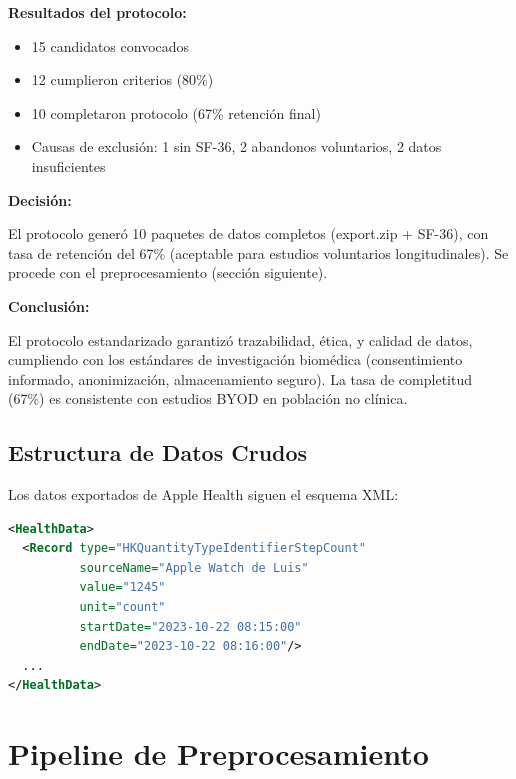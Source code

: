 \documentclass[12pt,letterpaper,twoside]{report}
\begin{document}
\begin{calculobox}
\textbf{Resultados del protocolo:}

\begin{itemize}[noitemsep]
    \item 15 candidatos convocados
    \item 12 cumplieron criterios (80\%)
    \item 10 completaron protocolo (67\% retención final)
    \item Causas de exclusión: 1 sin SF-36, 2 abandonos voluntarios, 2 datos insuficientes
\end{itemize}
\end{calculobox}

\begin{decisionbox}
\textbf{Decisión:}

El protocolo generó 10 paquetes de datos completos (export.zip + SF-36), con tasa de retención del 67\% (aceptable para estudios voluntarios longitudinales). Se procede con el preprocesamiento (sección siguiente).
\end{decisionbox}

\begin{conclusionbox}
\textbf{Conclusión:}

El protocolo estandarizado garantizó trazabilidad, ética, y calidad de datos, cumpliendo con los estándares de investigación biomédica (consentimiento informado, anonimización, almacenamiento seguro). La tasa de completitud (67\%) es consistente con estudios BYOD en población no clínica.
\end{conclusionbox}

\subsection{Estructura de Datos Crudos}

Los datos exportados de Apple Health siguen el esquema XML:

\begin{lstlisting}[language=XML, caption={Estructura XML de Apple Health Export}]
<HealthData>
  <Record type="HKQuantityTypeIdentifierStepCount"
          sourceName="Apple Watch de Luis"
          value="1245"
          unit="count"
          startDate="2023-10-22 08:15:00"
          endDate="2023-10-22 08:16:00"/>
  ...
</HealthData>
\end{lstlisting}

\section{Pipeline de Preprocesamiento}
\end{document}
